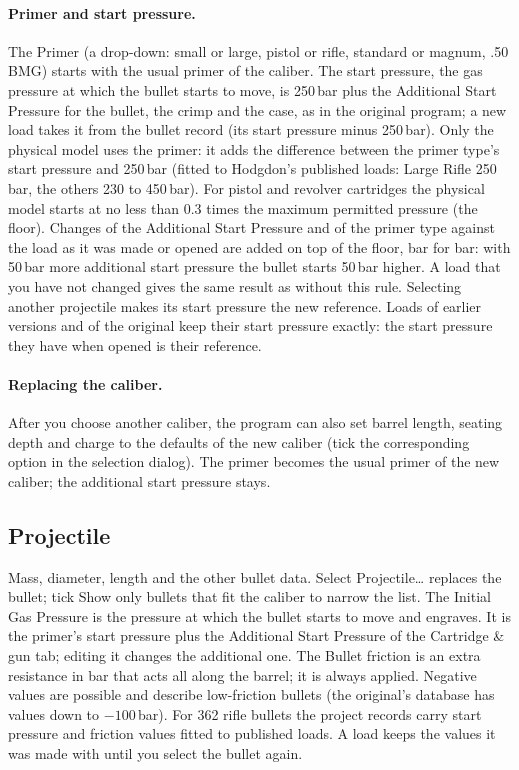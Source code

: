 \documentclass[11pt,a4paper]{article}
\newcommand{\ui}[1]{\textsf{#1}}
\begin{document}
\paragraph{Primer and start pressure.} The \ui{Primer} (a drop-down: small or large, pistol or rifle, standard or magnum, .50 BMG) starts with the
usual primer of the caliber. The start pressure, the gas pressure at which the bullet starts to move, is 250\,bar plus the \ui{Additional Start
Pressure} for the bullet, the crimp and the case, as in the original program; a new load takes it from the bullet record (its start pressure
minus 250\,bar). Only the physical model uses the primer: it adds the difference between the primer type's start pressure and 250\,bar (fitted to
Hodgdon's published loads: Large Rifle 250\,bar, the others 230 to 450\,bar). For pistol and revolver cartridges the physical model starts at no
less than 0.3 times the maximum permitted pressure (the floor). Changes of the \ui{Additional Start Pressure} and of the primer type against the
load as it was made or opened are added on top of the floor, bar for bar: with 50\,bar more additional start pressure the bullet starts 50\,bar
higher. A load that you have not changed gives the same result as without this rule. Selecting another projectile makes its start pressure the new
reference. Loads of earlier versions and of the original keep their start pressure exactly: the start pressure they have when opened is their
reference.

\paragraph{Replacing the caliber.} After you choose another caliber, the program can also set barrel length, seating depth and charge to the defaults
of the new caliber (tick the corresponding option in the selection dialog). The primer becomes the usual primer of the new caliber; the additional start
pressure stays.

\subsection{Projectile}
Mass, diameter, length and the other bullet data. \ui{Select Projectile\dots} replaces the bullet; tick \ui{Show only bullets that fit the caliber}
to narrow the list. The \ui{Initial Gas Pressure} is the pressure at which the bullet starts to move and engraves. It is the primer's start pressure plus the \ui{Additional Start Pressure} of the \ui{Cartridge \& gun} tab;
editing it changes the additional one. The \ui{Bullet friction} is an extra
resistance in bar that acts all along the barrel; it is always applied. Negative values are possible and describe low-friction bullets (the original's
database has values down to $-100$\,bar). For 362 rifle bullets the project records carry start pressure and friction values fitted to published loads.
A load keeps the values it was made with until you select the bullet again.
\end{document}
